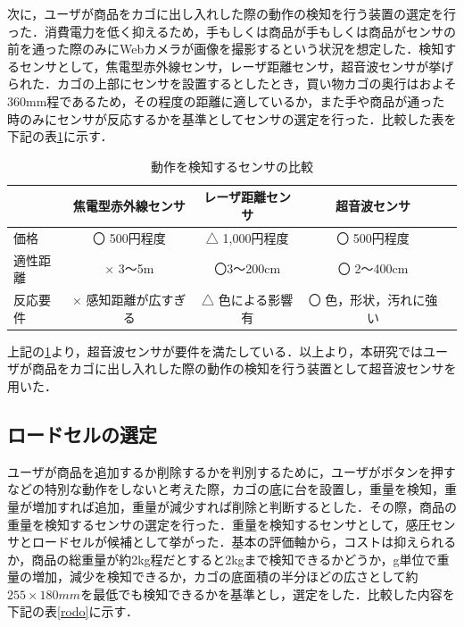 次に，ユーザが商品をカゴに出し入れした際の動作の検知を行う装置の選定を行った．消費電力を低く抑えるため，手もしくは商品が手もしくは商品がセンサの前を通った際のみにWebカメラが画像を撮影するという状況を想定した．検知するセンサとして，焦電型赤外線センサ，レーザ距離センサ，超音波センサが挙げられた．カゴの上部にセンサを設置するとしたとき，買い物カゴの奥行はおよそ360mm程であるため，その程度の距離に適しているか，また手や商品が通った時のみにセンサが反応するかを基準としてセンサの選定を行った．比較した表を下記の表\ref{kyori}に示す．


\begin{table}[htb]
\begin{center}
\caption{動作を検知するセンサの比較}
\begin{tabular}{|l|c|c|c|c|} \hline
 & 焦電型赤外線センサ & レーザ距離センサ & 超音波センサ \\ \hline \hline
価格 & 〇 500円程度 & △ 1,000円程度 & 〇 500円程度 \\
適性距離 & × 3～5m & 〇3～200cm & 〇 2～400cm \\ 
反応要件 & × 感知距離が広すぎる & △ 色による影響有 & 〇 色，形状，汚れに強い \\ \hline
\end{tabular}
\label{kyori}
\end{center}
\end{table}

上記の\ref{kyori}より，超音波センサが要件を満たしている．以上より，本研究ではユーザが商品をカゴに出し入れした際の動作の検知を行う装置として超音波センサを用いた．


\subsection{ロードセルの選定}

ユーザが商品を追加するか削除するかを判別するために，ユーザがボタンを押すなどの特別な動作をしないと考えた際，カゴの底に台を設置し，重量を検知，重量が増加すれば追加，重量が減少すれば削除と判断するとした．その際，商品の重量を検知するセンサの選定を行った．重量を検知するセンサとして，感圧センサとロードセルが候補として挙がった．基本の評価軸から，コストは抑えられるか，商品の総重量が約2kg程だとすると2kgまで検知できるかどうか，g単位で重量の増加，減少を検知できるか，カゴの底面積の半分ほどの広さとして約$255\times180mm$を最低でも検知できるかを基準とし，選定をした．比較した内容を下記の表\ref{rodo}に示す．


